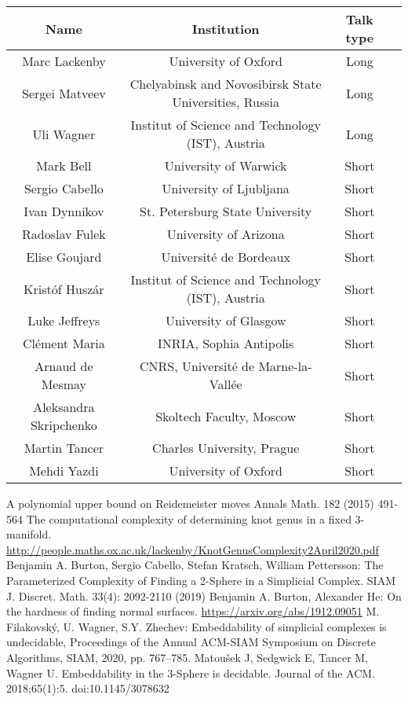\documentclass[12pt,fleqn]{article}
\begin{document}
\begin{center}
\begin{tabular}[h]{|c|c|c|l|}
  \hline
 Name & Institution & Talk type \\
\hline \hline
Marc Lackenby & University of Oxford & Long \\
  \hline
Sergei  Matveev & Chelyabinsk and  Novosibirsk State Universities, Russia& Long \\
  \hline
Uli Wagner & Institut of Science and Technology (IST), Austria & Long \\
  \hline
  \hline
 Mark Bell &  University of Warwick & Short \\
  \hline
 Sergio Cabello &  University of Ljubljana & Short \\
  \hline
 Ivan Dynnikov &  St. Petersburg State University & Short \\
  \hline
 Radoslav  Fulek &  University of Arizona & Short \\
  \hline
 Elise Goujard &  Université de Bordeaux & Short \\
  \hline
 Kristóf Huszár &  Institut of Science and Technology (IST), Austria & Short \\
  \hline
 Luke Jeffreys &  University of Glasgow & Short \\
  \hline
 Clément Maria &  INRIA, Sophia Antipolis & Short \\
  \hline
 Arnaud de Mesmay & CNRS, Université de Marne-la-Vallée & Short \\
  \hline
 Aleksandra Skripchenko &  Skoltech Faculty, Moscow & Short \\
  \hline
 Martin Tancer &  Charles University, Prague & Short \\
  \hline
 Mehdi Yazdi &  University of Oxford & Short \\
  \hline
\end{tabular}
\end{center}


\begin{thebibliography}{1}

A polynomial upper bound on Reidemeister moves Annals Math. 182 (2015) 491-564
The computational complexity of determining knot genus in a fixed 3-manifold.
\url{ http://people.maths.ox.ac.uk/lackenby/KnotGenusComplexity2April2020.pdf}
Benjamin A. Burton, Sergio Cabello, Stefan Kratsch, William Pettersson:
The Parameterized Complexity of Finding a 2-Sphere in a Simplicial Complex. SIAM J. Discret. Math. 33(4): 2092-2110 (2019)
Benjamin A. Burton, Alexander He:
On the hardness of finding normal surfaces. \url{https://arxiv.org/abs/1912.09051}
M. Filakovský, U. Wagner, S.Y. Zhechev: Embeddability of simplicial complexes is undecidable,
Proceedings of the Annual ACM-SIAM Symposium on Discrete Algorithms, SIAM, 2020, pp. 767–785. 
Matoušek J, Sedgwick E, Tancer M, Wagner U. Embeddability in the 3-Sphere is decidable. Journal of the ACM. 2018;65(1):5. doi:10.1145/3078632

\end{thebibliography}
\end{document}
